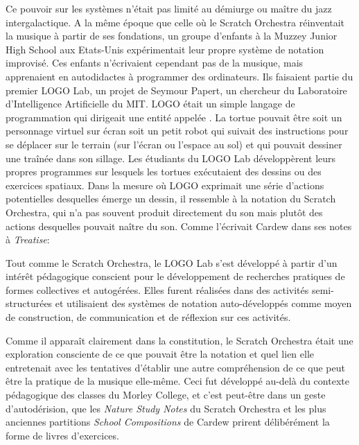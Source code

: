 {Ce pouvoir sur les syst\`emes n'\'etait pas limit\'e au d\'emiurge ou
ma\^itre du jazz intergalactique. A la m\^eme \'epoque que celle o\`u
le Scratch Orchestra r\'einventait la musique \`a partir de ses
fondations, un groupe d'enfants \`a la Muzzey Junior High School aux
Etats{}-Unis exp\'erimentait leur propre syst\`eme de notation
improvis\'e. Ces enfants n'\'ecrivaient cependant pas de la musique,
mais apprenaient en autodidactes \`a programmer des ordinateurs. Ils
faisaient partie du premier LOGO Lab, un projet de Seymour Papert, un
chercheur du Laboratoire d'Intelligence Artificielle du MIT. LOGO
\'etait un simple langage de programmation qui dirigeait une entit\'e
appel\'ee . La tortue pouvait \^etre soit un personnage virtuel
sur \'ecran soit un petit robot qui suivait des instructions pour se
d\'eplacer sur le terrain (sur l'\'ecran ou l'espace au sol) et qui
pouvait dessiner une tra\^in\'ee dans son sillage. Les \'etudiants du
LOGO Lab d\'evelopp\`erent leurs propres programmes sur lesquels les
tortues ex\'ecutaient des dessins ou des exercices spatiaux. Dans la
mesure o\`u LOGO exprimait une s\'erie d'actions potentielles
desquelles \'emerge un dessin, il ressemble \`a la notation du Scratch
Orchestra, qui n'a pas souvent produit directement du son mais plut\^ot
des actions desquelles pouvait na\^itre du son. Comme l'\'ecrivait
Cardew dans ses notes \`a {\em Treatise}: 


Tout comme le Scratch Orchestra, le LOGO Lab s'est d\'evelopp\'e \`a
partir d'un int\'er\^et p\'edagogique conscient pour le d\'eveloppement
de recherches pratiques de formes collectives et autog\'er\'ees. Elles
furent r\'ealis\'ees dans des activit\'es 
semi{}-structur\'ees et utilisaient des syst\`emes de notation
auto{}-d\'evelopp\'es comme moyen de construction, de communication et
de r\'eflexion sur ces activit\'es. 

Comme il appara\^it clairement dans la constitution, le Scratch
Orchestra \'etait une exploration consciente de ce que pouvait \^etre
la notation et quel lien elle entretenait avec les tentatives
d'\'etablir une autre compr\'ehension de ce que peut \^etre la pratique
de la musique elle{}-m\^eme. Ceci fut d\'evelopp\'e au{}-del\`a du
contexte p\'edagogique des classes du Morley College, et c'est
peut{}-\^etre dans un geste d'autod\'erision, que les {\em Nature
Study Notes} du Scratch Orchestra et les plus anciennes partitions
{\em School Compositions} de Cardew prirent d\'elib\'er\'ement la
forme de livres d'exercices.

}
